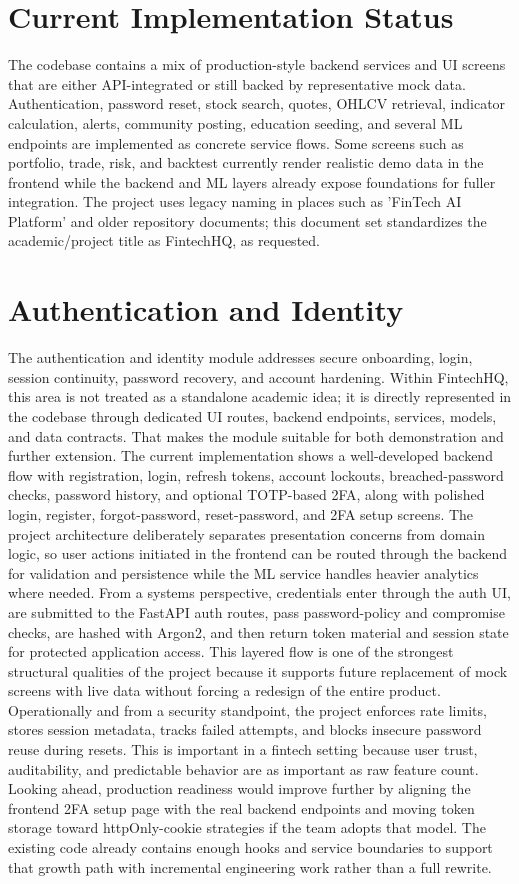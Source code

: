 \documentclass[11pt,a4paper]{article}
\begin{document}
\section{Current Implementation Status}
The codebase contains a mix of production-style backend services and UI screens that are either API-integrated or still backed by representative mock data. Authentication, password reset, stock search, quotes, OHLCV retrieval, indicator calculation, alerts, community posting, education seeding, and several ML endpoints are implemented as concrete service flows. Some screens such as portfolio, trade, risk, and backtest currently render realistic demo data in the frontend while the backend and ML layers already expose foundations for fuller integration. The project uses legacy naming in places such as 'FinTech AI Platform' and older repository documents; this document set standardizes the academic/project title as FintechHQ, as requested.
\section{Authentication and Identity}
The authentication and identity module addresses secure onboarding, login, session continuity, password recovery, and account hardening. Within FintechHQ, this area is not treated as a standalone academic idea; it is directly represented in the codebase through dedicated UI routes, backend endpoints, services, models, and data contracts. That makes the module suitable for both demonstration and further extension. The current implementation shows a well-developed backend flow with registration, login, refresh tokens, account lockouts, breached-password checks, password history, and optional TOTP-based 2FA, along with polished login, register, forgot-password, reset-password, and 2FA setup screens. The project architecture deliberately separates presentation concerns from domain logic, so user actions initiated in the frontend can be routed through the backend for validation and persistence while the ML service handles heavier analytics where needed. From a systems perspective, credentials enter through the auth UI, are submitted to the FastAPI auth routes, pass password-policy and compromise checks, are hashed with Argon2, and then return token material and session state for protected application access. This layered flow is one of the strongest structural qualities of the project because it supports future replacement of mock screens with live data without forcing a redesign of the entire product. Operationally and from a security standpoint, the project enforces rate limits, stores session metadata, tracks failed attempts, and blocks insecure password reuse during resets. This is important in a fintech setting because user trust, auditability, and predictable behavior are as important as raw feature count. Looking ahead, production readiness would improve further by aligning the frontend 2FA setup page with the real backend endpoints and moving token storage toward httpOnly-cookie strategies if the team adopts that model. The existing code already contains enough hooks and service boundaries to support that growth path with incremental engineering work rather than a full rewrite.
\end{document}
